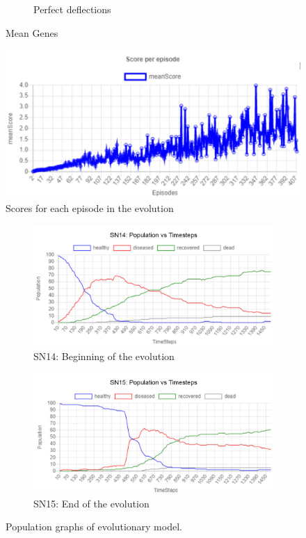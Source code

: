 \documentclass[a4paper,11pt]{article}
\begin{document}
\begin{figure}[h]
\begin{subfigure}[b]{0.33\linewidth}
            \caption{Perfect deflections}
            \label{fig:4.2c}
        \end{subfigure}
        \caption{Mean Genes}
        \label{fig:4.2}
    \end{figure}

    \begin{figure}[ht]
        \centering
        \includegraphics[width=0.5\linewidth]{diagrams/score_plot.jpg}
        \caption{Scores for each episode in the evolution}
        \label{fig:4.3}
    \end{figure}

    \begin{figure}[H]
        \centering
        \begin{subfigure}[b]{0.49\linewidth}
            \includegraphics[width=\linewidth]{pop_graphs/SN14_pop.jpg}
            \caption{SN14:  Beginning of the evolution}
            \label{fig:SN14}
        \end{subfigure}
        \begin{subfigure}[b]{0.49\linewidth}
            \includegraphics[width=\linewidth]{pop_graphs/SN15_pop.jpg}
            \caption{SN15:  End of the evolution}
            \label{fig:SN15}
        \end{subfigure}
        \caption{Population graphs of evolutionary model.}
    \end{figure}
\end{document}
